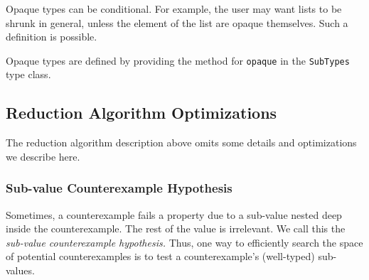 \documentclass{sigplanconf}
\newcommand{\ttp}[1]{\texttt{#1}}
\begin{document}
Opaque types can be conditional.  For example, the user may want lists to be
shrunk in general, unless the element of the list are opaque themselves.  Such a
definition is possible.

Opaque types are defined by providing the method for \ttp{opaque} in the
\ttp{SubTypes} type class.







\subsection{Reduction Algorithm Optimizations}\label{sec:optimizations}
The reduction algorithm description above omits some details and optimizations
we describe here.

\subsubsection{Sub-value Counterexample Hypothesis}\label{sec:subval}
Sometimes, a counterexample fails a property due to a sub-value nested deep
inside the counterexample.  The rest of the value is irrelevant.  We call this
the \emph{sub-value counterexample hypothesis.}  Thus, one way to efficiently
search the space of potential counterexamples is to test a counterexample's
(well-typed) sub-values.
\end{document}
